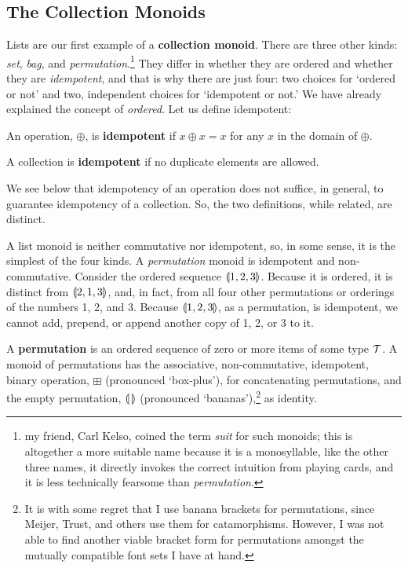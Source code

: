 \subsection{\color{Red}The Collection Monoids}


Lists are our first example of a \textbf{collection monoid}. There are three other kinds: \emph{set}, \emph{bag}, and \emph{permutation}.\footnote{my friend, Carl Kelso, coined the term \emph{suit} for such monoids; this is altogether a more suitable name because it is a monosyllable, like the other three names, it directly invokes the correct intuition from playing cards, and it is less technically fearsome than \emph{permutation}.} They differ in whether they are ordered and whether they are \emph{idempotent}, and that is why there are just four: two choices for `ordered or not' and two, independent choices for `idempotent or not.' We have already explained the concept of \emph{ordered}. Let us define idempotent:
\begin{definition}
An operation, $\oplus$, is \textbf{idempotent} if $x\oplus x=x$ for any $x$ in the domain of $\oplus$.
\label{def:idempotentoperation}
\end{definition}
\begin{definition}
A collection is \textbf{idempotent} if no duplicate elements are allowed.
\label{def:idempotentcollection}
\end{definition}


We see below that idempotency of an operation does not suffice, in general, to guarantee idempotency of a collection. So, the two definitions, while related, are distinct.


A list monoid is neither commutative nor idempotent, so, in some sense, it is the simplest of the four kinds. A \emph{permutation} monoid is idempotent and non-commutative. Consider the ordered sequence $\llparenthesis 1, 2, 3 \rrparenthesis$. Because it is ordered, it is distinct from $\llparenthesis 2, 1, 3 \rrparenthesis$, and, in fact, from all four other permutations or orderings of the numbers 1, 2, and 3. Because $\llparenthesis 1, 2, 3 \rrparenthesis$, as a permutation, is idempotent, we cannot add, prepend, or append another copy of 1, 2, or 3 to it.


\begin{trial}
  A \textbf{permutation} is an ordered sequence of zero or more items of some type $\mathcal{T}$. A monoid of permutations has the associative, non-commutative, idempotent, binary operation, $\boxplus$ (pronounced `box-plus'), for concatenating permutations, and the empty permutation, $\llparenthesis\,\rrparenthesis$ (pronounced `bananas'),\footnote{It is with some regret that I use banana brackets for permutations, since Meijer, Trust, and others use them for catamorphisms. However, I was not able to find another viable bracket form for permutations amongst the mutually compatible font sets I have at hand.} as identity.
\end{trial}


